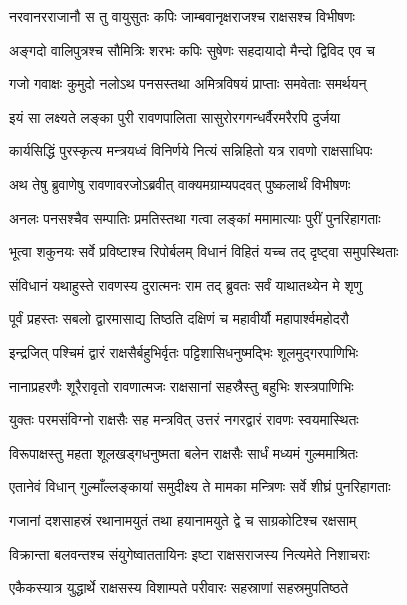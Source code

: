 
\twolineshloka
{नरवानरराजानौ स तु वायुसुतः कपिः}
{जाम्बवानृक्षराजश्च राक्षसश्च विभीषणः} %

\twolineshloka
{अङ्गदो वालिपुत्रश्च सौमित्रिः शरभः कपिः}
{सुषेणः सहदायादो मैन्दो द्विविद एव च} %

\twolineshloka
{गजो गवाक्षः कुमुदो नलोऽथ पनसस्तथा}
{अमित्रविषयं प्राप्ताः समवेताः समर्थयन्} %

\twolineshloka
{इयं सा लक्ष्यते लङ्का पुरी रावणपालिता}
{सासुरोरगगन्धर्वैरमरैरपि दुर्जया} %

\twolineshloka
{कार्यसिद्धिं पुरस्कृत्य मन्त्रयध्वं विनिर्णये}
{नित्यं सन्निहितो यत्र रावणो राक्षसाधिपः} %

\twolineshloka
{अथ तेषु ब्रुवाणेषु रावणावरजोऽब्रवीत्}
{वाक्यमग्राम्यपदवत् पुष्कलार्थं विभीषणः} %

\twolineshloka
{अनलः पनसश्चैव सम्पातिः प्रमतिस्तथा}
{गत्वा लङ्कां ममामात्याः पुरीं पुनरिहागताः} %

\twolineshloka
{भूत्वा शकुनयः सर्वे प्रविष्टाश्च रिपोर्बलम्}
{विधानं विहितं यच्च तद् दृष्ट्वा समुपस्थिताः} %

\twolineshloka
{संविधानं यथाहुस्ते रावणस्य दुरात्मनः}
{राम तद् ब्रुवतः सर्वं याथातथ्येन मे शृणु} %

\twolineshloka
{पूर्वं प्रहस्तः सबलो द्वारमासाद्य तिष्ठति}
{दक्षिणं च महावीर्यौ महापार्श्वमहोदरौ} %

\twolineshloka
{इन्द्रजित् पश्चिमं द्वारं राक्षसैर्बहुभिर्वृतः}
{पट्टिशासिधनुष्मद्भिः शूलमुद्गरपाणिभिः} %

\twolineshloka
{नानाप्रहरणैः शूरैरावृतो रावणात्मजः}
{राक्षसानां सहस्रैस्तु बहुभिः शस्त्रपाणिभिः} %

\twolineshloka
{युक्तः परमसंविग्नो राक्षसैः सह मन्त्रवित्}
{उत्तरं नगरद्वारं रावणः स्वयमास्थितः} %

\twolineshloka
{विरूपाक्षस्तु महता शूलखड्गधनुष्मता}
{बलेन राक्षसैः सार्धं मध्यमं गुल्ममाश्रितः} %

\twolineshloka
{एतानेवं विधान् गुल्माँल्लङ्कायां समुदीक्ष्य ते}
{मामका मन्त्रिणः सर्वे शीघ्रं पुनरिहागताः} %

\twolineshloka
{गजानां दशसाहस्रं रथानामयुतं तथा}
{हयानामयुते द्वे च साग्रकोटिश्च रक्षसाम्} %

\twolineshloka
{विक्रान्ता बलवन्तश्च संयुगेष्वाततायिनः}
{इष्टा राक्षसराजस्य नित्यमेते निशाचराः} %

\twolineshloka
{एकैकस्यात्र युद्धार्थे राक्षसस्य विशाम्पते}
{परीवारः सहस्राणां सहस्रमुपतिष्ठते} %

